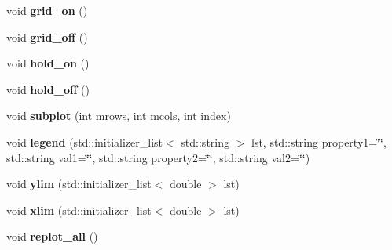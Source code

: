 \begin{DoxyCompactItemize}
\item 
\hypertarget{classkeycpp_1_1_figure_a3c036559f8ad56b099ac0b44c652225d}{void {\bfseries grid\-\_\-on} ()}\label{classkeycpp_1_1_figure_a3c036559f8ad56b099ac0b44c652225d}

\item 
\hypertarget{classkeycpp_1_1_figure_a3736e01bc278c2c2b47e4ff046fdda0e}{void {\bfseries grid\-\_\-off} ()}\label{classkeycpp_1_1_figure_a3736e01bc278c2c2b47e4ff046fdda0e}

\item 
\hypertarget{classkeycpp_1_1_figure_a65b80e5b67c7bbf225e3001a538a6dad}{void {\bfseries hold\-\_\-on} ()}\label{classkeycpp_1_1_figure_a65b80e5b67c7bbf225e3001a538a6dad}

\item 
\hypertarget{classkeycpp_1_1_figure_ae5e5ac67e9450ea4fbf06fb3fcc6523a}{void {\bfseries hold\-\_\-off} ()}\label{classkeycpp_1_1_figure_ae5e5ac67e9450ea4fbf06fb3fcc6523a}

\item 
\hypertarget{classkeycpp_1_1_figure_a59b0acbd975579bf8330849f004637fc}{void {\bfseries subplot} (int mrows, int mcols, int index)}\label{classkeycpp_1_1_figure_a59b0acbd975579bf8330849f004637fc}

\item 
\hypertarget{classkeycpp_1_1_figure_a2b5a0aae355a33024d2f6c51a8754786}{void {\bfseries legend} (std\-::initializer\-\_\-list$<$ std\-::string $>$ lst, std\-::string property1=\char`\"{}\char`\"{}, std\-::string val1=\char`\"{}\char`\"{}, std\-::string property2=\char`\"{}\char`\"{}, std\-::string val2=\char`\"{}\char`\"{})}\label{classkeycpp_1_1_figure_a2b5a0aae355a33024d2f6c51a8754786}

\item 
\hypertarget{classkeycpp_1_1_figure_aa01c44e6509c7075f4f547531c39741b}{void {\bfseries ylim} (std\-::initializer\-\_\-list$<$ double $>$ lst)}\label{classkeycpp_1_1_figure_aa01c44e6509c7075f4f547531c39741b}

\item 
\hypertarget{classkeycpp_1_1_figure_ae779c53eebbee42148324bd8adfd7d01}{void {\bfseries xlim} (std\-::initializer\-\_\-list$<$ double $>$ lst)}\label{classkeycpp_1_1_figure_ae779c53eebbee42148324bd8adfd7d01}

\item 
\hypertarget{classkeycpp_1_1_figure_a47cae082612e5436a6b0bc3d7f27e9d9}{void {\bfseries replot\-\_\-all} ()}\label{classkeycpp_1_1_figure_a47cae082612e5436a6b0bc3d7f27e9d9}


\end{DoxyCompactItemize}
